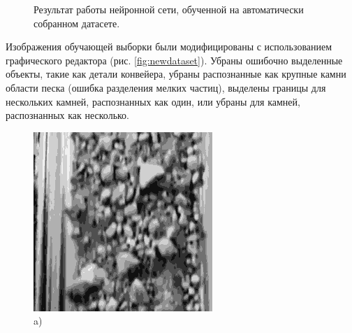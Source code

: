 \documentclass[times]{itmo-student-thesis}
\begin{document}
\begin{figure}[h!]
\begin{minipage}[h]{0.49\linewidth}
	\end{minipage}
	\caption{Результат работы нейронной сети, обученной на автоматически собранном датасете.}
	\label{fig:result}
\end{figure}

Изображения обучающей выборки были модифицированы с использованием графического редактора (рис. \ref{fig:newdataset}). Убраны ошибочно выделенные объекты, такие как детали конвейера, убраны распознанные как крупные камни области песка (ошибка разделения мелких частиц), выделены границы для нескольких камней, распознанных как один, или убраны для камней, распознанных как несколько.

 \begin{figure}[h!]
 	\begin{minipage}[h]{0.49\linewidth}
 		\centering
 		\includegraphics[width=\linewidth]{images/train3} \\ a)
 	\end{minipage}
 	\hfill
 	\begin{minipage}[h]{0.49\linewidth}
 		\centering

\end{minipage}
\end{figure}
\end{document}
